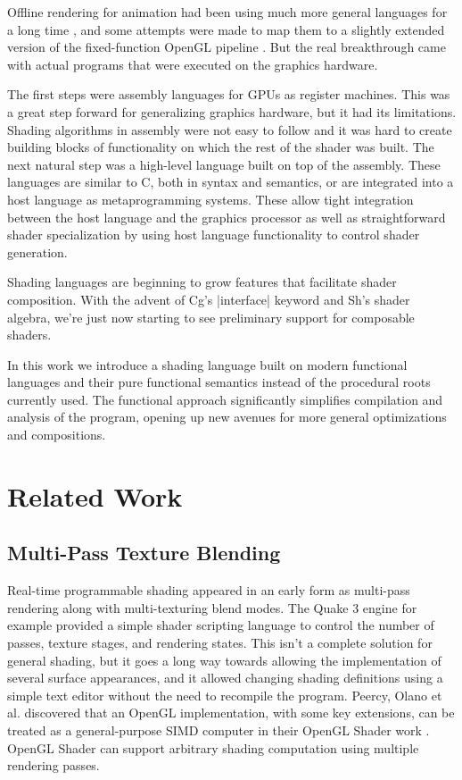 \documentclass[review]{acmsiggraph}      %
\begin{document}
Offline rendering for animation had been using much more general languages
for a long time \cite{HanrahanRenderman}, and some attempts were made to map 
them to a slightly extended version of the fixed-function OpenGL pipeline 
\cite{peercy00interactive}. But the real breakthrough came with actual
programs that were executed on the graphics hardware. 

The first steps were assembly languages for GPUs as register machines.
This was a great step forward for generalizing graphics hardware, but
it had its limitations.  Shading algorithms in assembly were not easy
to follow and it was hard to create building blocks of functionality
on which the rest of the shader was built.  The next natural step was
a high-level language built on top of the assembly.  These languages
are similar to C, both in syntax and semantics, or are integrated into
a host language as metaprogramming systems.  These allow tight
integration between the host language and the graphics processor as
well as straightforward shader specialization by using host language
functionality to control shader generation.

Shading languages are beginning to grow features that facilitate
shader composition.  With the advent of Cg's |interface| keyword and
Sh's shader algebra, we're just now starting to see preliminary
support for composable shaders.

In this work we introduce a shading language built on modern
functional languages and their pure functional semantics instead of the
procedural roots currently used. The functional approach significantly
simplifies compilation and analysis of the program, opening up new
avenues for more general optimizations and compositions.

\section{Related Work}

\subsection{Multi-Pass Texture Blending }

Real-time programmable shading appeared in an early form as multi-pass
rendering along with multi-texturing blend modes.  The Quake 3 engine
for example provided a simple shader scripting language to control the
number of passes, texture stages, and rendering states.  This isn't a
complete solution for general shading, but it goes a long way towards
allowing the implementation of several surface appearances, and it allowed
changing shading definitions using a simple text editor without the need to
recompile the program.  Peercy,
Olano et al. discovered that an OpenGL implementation, with some key
extensions, can be treated as a general-purpose SIMD computer in their
OpenGL Shader work \cite{peercy00interactive}.  OpenGL Shader can
support arbitrary shading computation using multiple rendering
passes.
\end{document}
